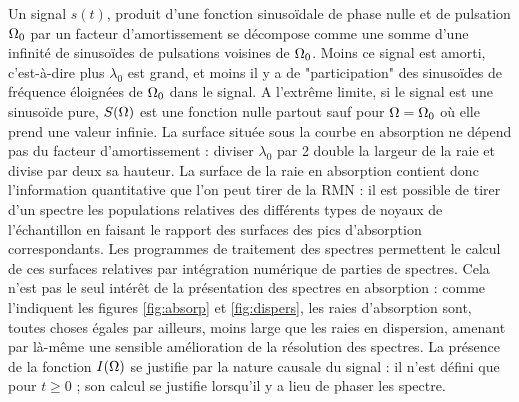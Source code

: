 Un signal $s(t)$, produit d'une fonction sinusoïdale
de phase nulle et de pulsation $\Omega_0$ par 
un facteur d'amortissement se décompose comme une somme d'une infinité de 
sinusoïdes de pulsations voisines de $\Omega_0$. 
Moins ce signal est amorti, c'est-à-dire plus $\lambda_0$ est grand, 
et moins il y a de "participation" des sinusoïdes de fréquence éloignées de $\Omega_0$ 
dans le signal. 
A l'extrême limite, si le signal est une sinusoïde pure, $S(\Omega)$ est 
une fonction nulle partout sauf pour $\Omega = \Omega_0$ où elle prend une valeur infinie. 
La surface située sous la courbe en absorption ne dépend pas 
du facteur d'amortissement : diviser 
$\lambda_0$ par 2 double la largeur de la raie et divise par deux sa hauteur. 
La surface de la raie en absorption contient donc l'information quantitative 
que l'on peut tirer de la RMN : 
il est possible de tirer d'un spectre les populations relatives des différents types de noyaux 
de l'échantillon en faisant le rapport des surfaces des pics d'absorption correspondants. 
Les programmes de traitement des spectres permettent le calcul de ces surfaces relatives 
par intégration numérique de parties de spectres. 
Cela n'est pas le seul intérêt de la présentation des spectres en absorption : 
comme l'indiquent les figures \ref{fig:absorp} et \ref{fig:dispers}, les raies 
d'absorption sont, toutes choses égales par ailleurs, moins large que les raies en 
dispersion, amenant par là-même une sensible amélioration de la résolution des 
spectres. 
La présence de la fonction $I(\Omega)$ se justifie par la nature causale du signal : il 
n'est défini que pour $t \ge 0$ ; son calcul se justifie lorsqu'il y a lieu de phaser les spectre.

